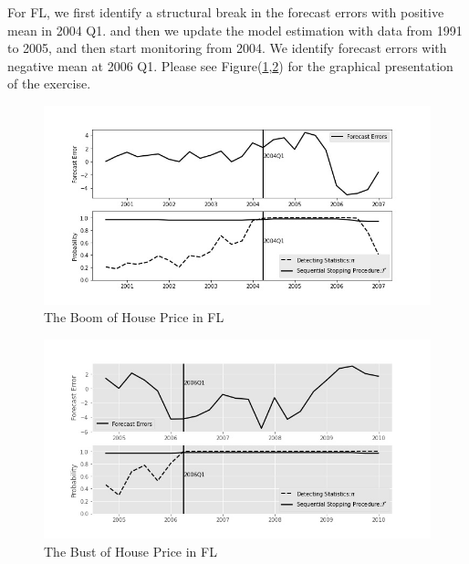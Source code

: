 \documentclass[preprint,authoryear,12pt,english]{elsarticle}
\theoremstyle{plain}
\begin{document}
For FL, we first identify a structural break in the forecast errors with positive mean in 2004 Q1. and then we update the model estimation with data from 1991 to 2005, and then start monitoring from 2004. We identify forecast errors with negative mean at 2006 Q1. Please see Figure(\ref{fig:FL_boom},\ref{fig:FL_bust}) for the graphical presentation of the exercise.
\noindent \begin{center}
    \begin{figure}[H]
        \centering
        \includegraphics[scale=0.5]{"graph/Bsquid_FL_boom"}
        \protect\caption{\label{fig:FL_boom}The Boom of House Price in FL}
    \end{figure}
    \par\end{center}
\noindent \begin{center}
    \begin{figure}[H]
        \centering
        \includegraphics[scale=0.5]{"graph/Bsquid_FL_bust"}
        \protect\caption{\label{fig:FL_bust} The Bust of House Price in FL}
    \end{figure}
    \par\end{center}
\end{document}
